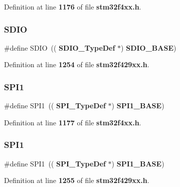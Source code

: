 Definition at line \textbf{ 1176} of file \textbf{ stm32f4xx.\+h}.

\mbox{\label{group__Peripheral__declaration_ga8149aa2760fffac16bc75216d5fd9331}} 
\subsubsection{S\+D\+IO\hspace{0.1cm}{\footnotesize\ttfamily [2/2]}}
{\footnotesize\ttfamily \#define S\+D\+IO~((\textbf{ S\+D\+I\+O\+\_\+\+Type\+Def} $\ast$) \textbf{ S\+D\+I\+O\+\_\+\+B\+A\+SE})}



Definition at line \textbf{ 1254} of file \textbf{ stm32f429xx.\+h}.

\mbox{\label{group__Peripheral__declaration_gad483be344a28ac800be8f03654a9612f}} 
\subsubsection{S\+P\+I1\hspace{0.1cm}{\footnotesize\ttfamily [1/2]}}
{\footnotesize\ttfamily \#define S\+P\+I1~((\textbf{ S\+P\+I\+\_\+\+Type\+Def} $\ast$) \textbf{ S\+P\+I1\+\_\+\+B\+A\+SE})}



Definition at line \textbf{ 1177} of file \textbf{ stm32f4xx.\+h}.

\mbox{\label{group__Peripheral__declaration_gad483be344a28ac800be8f03654a9612f}} 
\subsubsection{S\+P\+I1\hspace{0.1cm}{\footnotesize\ttfamily [2/2]}}
{\footnotesize\ttfamily \#define S\+P\+I1~((\textbf{ S\+P\+I\+\_\+\+Type\+Def} $\ast$) \textbf{ S\+P\+I1\+\_\+\+B\+A\+SE})}



Definition at line \textbf{ 1255} of file \textbf{ stm32f429xx.\+h}.

